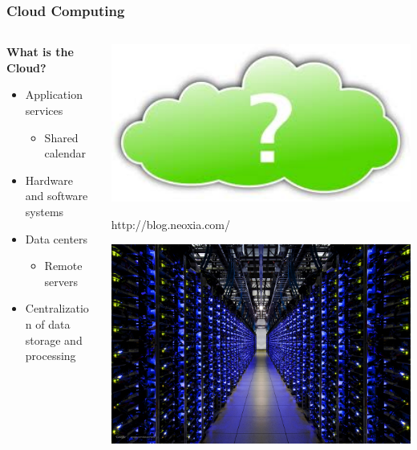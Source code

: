 \documentclass{beamer}
\begin{document}
\begin{frame}
  \frametitle{Cloud Computing}
 \begin{columns}
	\begin{column}{0.55\textwidth}
 		\large{\textbf{What is the Cloud?}}
 		\begin{itemize}
 			\item Application services
 				\begin{itemize}
 					\item Shared calendar
 				\end{itemize}
 			\item Hardware and software systems
 			\linebreak 
 			\item Data centers 
 				\begin{itemize}
 					\item Remote servers
 				\end{itemize}
 			\item Centralization of data storage and processing
 		\end{itemize}
	\end{column}
\begin{column}{0.45\textwidth}
	\includegraphics[width=1.0\textwidth]{GreenQuestionMark.jpg} \\
	\tiny{
		\begin{flushright}
			http://blog.neoxia.com/
		\end{flushright}
	}
	\includegraphics[width=1.0\textwidth]{Servers.jpg} \\

\end{column}
\end{columns}
\end{frame}
\end{document}
